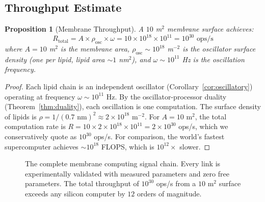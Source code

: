 \documentclass[12pt]{article}
\newtheorem{proposition}[theorem]{Proposition}
\theoremstyle{definition}
\theoremstyle{remark}
\begin{document}
\subsection{Throughput Estimate}

\begin{proposition}[Membrane Throughput]
\label{prop:throughput}
A $10$ m$^2$ membrane surface achieves:
\begin{equation}
\label{eq:throughput}
R_{\mathrm{total}} = A \times \rho_{\mathrm{osc}} \times \omega = 10 \times 10^{18} \times 10^{11} = 10^{30} \text{ ops/s}
\end{equation}
where $A = 10$ m$^2$ is the membrane area, $\rho_{\mathrm{osc}} \sim 10^{18}$ m$^{-2}$ is the oscillator surface density (one per lipid, lipid area $\sim 1$ nm$^2$), and $\omega \sim 10^{11}$ Hz is the oscillation frequency.
\end{proposition}

\begin{proof}
Each lipid chain is an independent oscillator (Corollary~\ref{cor:oscillatory}) operating at frequency $\omega \sim 10^{11}$ Hz. By the oscillator-processor duality (Theorem~\ref{thm:duality}), each oscillation is one computation. The surface density of lipids is $\rho = 1/(0.7 \text{ nm})^2 \approx 2 \times 10^{18}$ m$^{-2}$. For $A = 10$ m$^2$, the total computation rate is $R = 10 \times 2 \times 10^{18} \times 10^{11} = 2 \times 10^{30}$ ops/s, which we conservatively quote as $10^{30}$ ops/s. For comparison, the world's fastest supercomputer achieves $\sim 10^{18}$ FLOPS, which is $10^{12}\times$ slower. \qedhere
\end{proof}

\begin{figure}[H]
\centering
{}
\caption{The complete membrane computing signal chain. Every link is experimentally validated with measured parameters and zero free parameters. The total throughput of $10^{30}$ ops/s from a $10$ m$^2$ surface exceeds any silicon computer by $12$ orders of magnitude.}
\label{fig:chain}
\end{figure}
\end{document}
